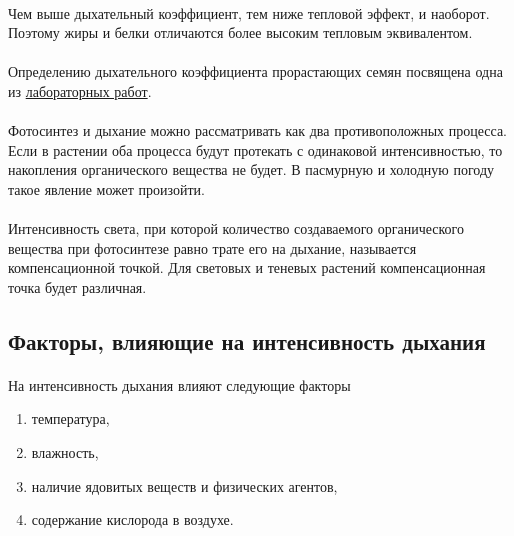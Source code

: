 \paragraph*{}Чем выше дыхательный коэффициент, тем ниже тепловой эффект, и наоборот. Поэтому жиры и белки отличаются более высоким тепловым эквивалентом.

\paragraph*{}Определению дыхательного коэффициента прорастающих семян посвящена одна из \hyperlink{breazing_index_lab}{лабораторных работ}.


\paragraph*{}Фотосинтез и дыхание можно рассматривать как два противоположных процесса. Если в растении оба процесса будут протекать с одинаковой интенсивностью, то накопления органического вещества не будет. В пасмурную и холодную погоду такое явление может произойти. 

\paragraph*{}Интенсивность света, при которой количество создаваемого органического вещества при фотосинтезе равно трате его на дыхание, называется компенсационной точкой. Для световых и теневых растений компенсационная точка будет различная.

\subsection*{Факторы, влияющие на интенсивность дыхания}

\paragraph*{}На интенсивность дыхания влияют следующие факторы

\begin{enumerate}

\item температура, 
\item влажность, 
\item наличие ядовитых веществ и физических агентов, 
\item содержание кислорода в воздухе.

\end{enumerate}

